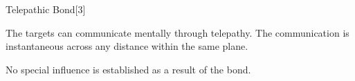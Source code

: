 \begin{spellsection}{Telepathic Bond}[3]
    \begin{spellheader}
    \end{spellheader}
    \begin{spellcontent}
        \begin{spelltargetinginfo}
        \end{spelltargetinginfo}
        \begin{spelleffects}
            \spelleffect The targets can communicate mentally through telepathy. The communication is instantaneous across any distance within the same plane.
            \spelldur \durext \dismissable
        \end{spelleffects}
    \end{spellcontent}
    \begin{spellfooter}
        \spellnotes No special influence is established as a result of the bond.
    \end{spellfooter}
    \begin{spellaugments}
    \end{spellaugments}
\end{spellsection}

